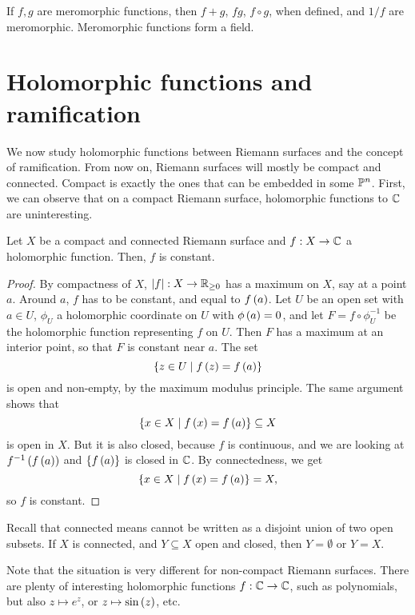 \begin{remark}
If $ f, g $ are meromorphic functions, then $ f + g $, $ fg $, $ f \circ g $, when defined, and $ 1 / f $ are meromorphic. Meromorphic functions form a field.
\end{remark}

\pagebreak

\section{Holomorphic functions and ramification}

We now study holomorphic functions between Riemann surfaces and the concept of ramification. From now on, Riemann surfaces will mostly be compact and connected. Compact is exactly the ones that can be embedded in some $ \P^n $. First, we can observe that on a compact Riemann surface, holomorphic functions to $ \C $ are uninteresting.

\begin{proposition}
Let $ X $ be a compact and connected Riemann surface and $ f : X \to \C $ a holomorphic function. Then, $ f $ is constant.
\end{proposition}

\begin{proof}
By compactness of $ X $, $ \abs{f} : X \to \R_{\ge 0} $ has a maximum on $ X $, say at a point $ a $. Around $ a $, $ f $ has to be constant, and equal to $ f\rb{a} $. Let $ U $ be an open set with $ a \in U $, $ \phi_U $ a holomorphic coordinate on $ U $ with $ \phi\rb{a} = 0 $, and let $ F = f \circ \phi_U^{-1} $ be the holomorphic function representing $ f $ on $ U $. Then $ F $ has a maximum at an interior point, so that $ F $ is constant near $ a $. The set
$$ \cb{z \in U \mid f\rb{z} = f\rb{a}} $$
is open and non-empty, by the maximum modulus principle. The same argument shows that
$$ \cb{x \in X \mid f\rb{x} = f\rb{a}} \subseteq X $$
is open in $ X $. But it is also closed, because $ f $ is continuous, and we are looking at $ f^{-1}\rb{f\rb{a}} $ and $ \cb{f\rb{a}} $ is closed in $ \C $. By connectedness, we get
$$ \cb{x \in X \mid f\rb{x} = f\rb{a}} = X, $$
so $ f $ is constant.
\end{proof}

Recall that connected means cannot be written as a disjoint union of two open subsets. If $ X $ is connected, and $ Y \subseteq X $ open and closed, then $ Y = \emptyset $ or $ Y = X $.

\begin{remark}
Note that the situation is very different for non-compact Riemann surfaces. There are plenty of interesting holomorphic functions $ f : \C \to \C $, such as polynomials, but also $ z \mapsto e^z $, or $ z \mapsto \sin\rb{z} $, etc.
\end{remark}

